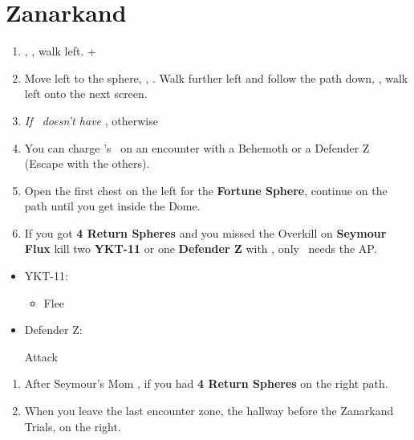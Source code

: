 \chapter{Zanarkand}
\begin{enumerate}
    \item \sd, \cs[0:50], walk left. \fmv+\cs[2:20]
    \item Move left to the sphere, \sd, \cs[1:40]. Walk further left and follow the path down, \cs[3:20], walk left onto the next screen.
    \item \textit{If \rikku\ doesn't have \od} \formation{\tidus}{\auron}{\rikku}, otherwise \formation{\tidus}{\auron}{\kimahri}
    \item You can charge \rikku's \od\ on an encounter with a Behemoth or a Defender Z (Escape with the others).
    \item Open the first chest on the left for the \textbf{Fortune Sphere}, continue on the path until you get inside the Dome.
    \item If you got \textbf{4 Return Spheres} and you missed the Overkill on \textbf{Seymour Flux} kill two \textbf{YKT-11} or one \textbf{Defender Z} with \formation{\tidus}{\auron}{\yuna}, only \yuna\ needs the AP.
\end{enumerate}
\begin{encounters}
    \begin{itemize}
        \item YKT-11:
        \begin{itemize}
            \yunaf Attack
            \tidusf Attack
            \item Flee
        \end{itemize}
        \item Defender Z:
        \begin{itemize}
            \summon{\bahamut}
            \bahamutf Attack
        \end{itemize}
    \end{itemize}
\end{encounters}
\begin{enumerate}[resume]
    \item After Seymour's Mom \cs, if you had \textbf{4 Return Spheres}  on the right path.
    \item When you leave the last encounter zone, the hallway before the Zanarkand Trials,  on the right.
\end{enumerate}
\winvfill
\winnp
\lossvfill
\lossnp
